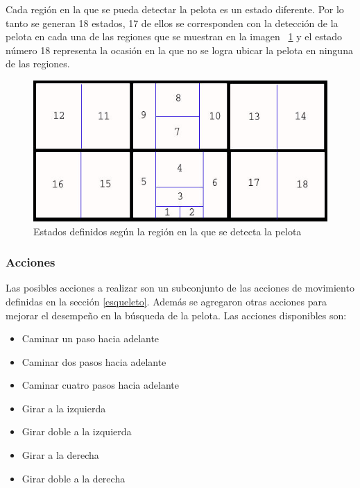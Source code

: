 Cada región en la que se pueda detectar la pelota es un estado diferente. Por lo tanto se generan 18 estados, 17 de ellos se corresponden con la detección de la pelota en cada una de las regiones que se muestran en la imagen ~\ref{fig:estados2} y el estado número 18 representa la ocasión en la que no se logra ubicar la pelota en ninguna de las regiones.  

\begin{figure}[hbtp]
\centering
\includegraphics[scale=0.5]{imagenes/Regiones2.jpg}
\caption{Estados definidos seg\'un la región en la que se detecta la pelota}
\label{fig:estados2}
\end{figure}


\subsubsection{Acciones}\label{sec:acciones}

Las posibles acciones a realizar son un subconjunto de las acciones de movimiento definidas en la sección \ref{esqueleto}. Además se agregaron otras acciones para mejorar el desempeño en la búsqueda de la pelota. Las acciones disponibles son:

\begin{itemize}[noitemsep, nolistsep]
\item {Caminar un paso hacia adelante }
\item {Caminar dos pasos hacia adelante }
\item {Caminar cuatro pasos hacia adelante}
\item {Girar a la izquierda}
\item {Girar doble a la izquierda} 
\item {Girar a la derecha }
\item {Girar doble a la derecha}
\label{item:todaslasacciones}
\end{itemize}

